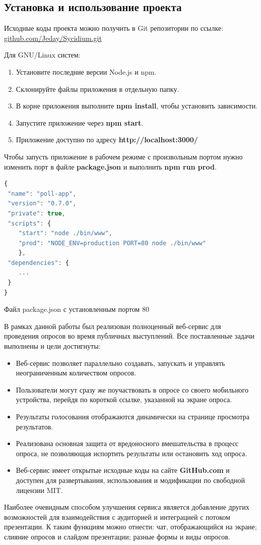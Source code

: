 \subsection{Установка и использование проекта}  
Исходные коды проекта можно получить в Git репозитории по ссылке:
\href{https://github.com/Jeday/Sycidium.git}{github.com/Jeday/Sycidium.git}

Для GNU/Linux систем:
\begin{enumerate}
	\item Установите последние версии Node.js и npm.
	\item Склонируйте файлы приложения в отдельную папку.
	\item В корне приложения выполните \textbf{npm install}, чтобы установить зависимости.
	\item Запустите приложение через \textbf{npm start}.
	\item Приложение доступно по адресу \textbf{http://localhost:3000/}
\end{enumerate}

Чтобы запусть приложение в рабочем режиме с произвольным портом нужно изменить порт в файле \textbf{package.json} и выполнить \textbf{npm run prod}.
  \begin{ListingEnv}
 \begin{lstlisting}[language=JavaScript]
{
 "name": "poll-app",
 "version": "0.7.0",
 "private": true,
 "scripts": {
 	"start": "node ./bin/www",
 	"prod": "NODE_ENV=production PORT=80 node ./bin/www"
    },
 "dependencies": {
	...
 }
}

\end{lstlisting}
	\caption{Файл package.json с установленным портом 80}
\label{list:pack-json}
\end{ListingEnv}      



\newpage
\Conc
В рамках данной работы был реализован полноценный веб-сервис для проведения опросов во время публичных выступлений. Все поставленные задачи выполнены и цели достигнуты:
\begin{itemize}
	\item Веб-сервис позволяет параллельно создавать, запускать и управлять неограниченным количеством опросов.
	\item Пользователи могут сразу же поучаствовать в опросе со своего мобильного устройства, перейдя по короткой ссылке, указанной на экране опроса.
	\item Результаты голосования отображаются динамически на странице просмотра результатов.
	\item Реализована основная защита от вредоносного вмешательства в процесс опроса, не позволяющая испортить результаты или остановить ход опроса.
	\item Веб-сервис имеет открытые исходные коды на сайте \textbf{GitHub.com} и доступен для развертывания, использования и модификации по свободной лицензии MIT. 
\end{itemize}              
Наиболее очевидным способом улучшения сервиса является добавление других возможностей для взаимодействия с аудиторией и интеграцией с потоком презентации. К таким функциям можно отнести: чат, отображающийся на экране; слияние опросов и слайдом презентации; разные формы и виды опросов.


